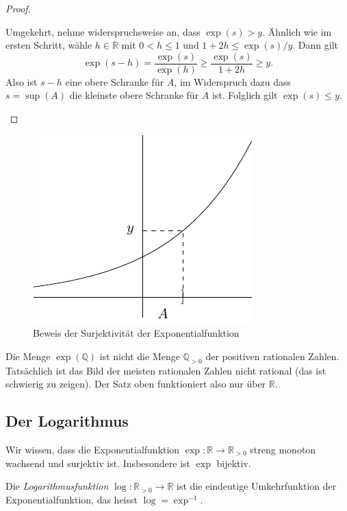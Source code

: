 \documentclass[../main.tex]{subfiles}
\begin{document}
\begin{proof}
\begin{itemize}
      Umgekehrt, nehme widerspruchsweise an,
      dass $\exp(s) > y$. Ähnlich wie im ersten Schritt, wähle
      $h \in \mathbb{R}$ mit $0 < h \leq 1$ 
      und $1 + 2h \leq \exp(s)/y$.
      Dann gilt
      \[
        \exp(s-h) = \frac{\exp(s)}{\exp(h)}
        \geq \frac{\exp(s)}{1 + 2h} \geq y.
      \]
      Also ist $s-h$ eine obere Schranke für $A$,
      im Widerspruch dazu dass $s = \sup(A)$ die
      kleinste obere Schranke für $A$ ist.
      Folglich gilt $\exp(s) \leq y$. \qedhere
  \end{itemize}
\end{proof}

\begin{figure}[htb]
  \centering
  \includegraphics{images/exp}
  \caption{Beweis der Surjektivität der Exponentialfunktion}%
  \label{fig:exp}
\end{figure}


\begin{remark}
  Die Menge $\exp(\mathbb{Q})$ ist nicht die Menge
  $\mathbb{Q}_{>0}$ der positiven rationalen Zahlen.
  Tatsächlich ist das Bild der meisten rationalen Zahlen
  nicht rational (das ist schwierig zu zeigen).
  Der Satz oben funktioniert also nur über $\mathbb{R}$.
\end{remark}

\subsection*{Der Logarithmus}
Wir wissen, dass die Exponentialfunktion
$
  \exp \colon \mathbb{R} \to \mathbb{R}_{>0}
  $
streng monoton wachsend und surjektiv ist.
Insbesondere ist $\exp$ bijektiv.

\begin{definition}
  Die \emph{Logarithmusfunktion}
  $\log \colon \mathbb{R}_{>0} \to \mathbb{R}$ ist die
  eindeutige Umkehrfunktion der Exponentialfunktion,
  das heisst $\log = \exp^{-1}$.
\end{definition}
\end{document}
